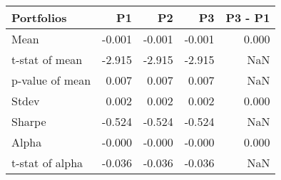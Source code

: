 \begin{tabular}{lrrrr}
\toprule
Portfolios & P1 & P2 & P3 & P3 - P1 \\
\midrule
Mean & -0.001 & -0.001 & -0.001 & 0.000 \\
t-stat of mean & -2.915 & -2.915 & -2.915 & NaN \\
p-value of mean & 0.007 & 0.007 & 0.007 & NaN \\
Stdev & 0.002 & 0.002 & 0.002 & 0.000 \\
Sharpe & -0.524 & -0.524 & -0.524 & NaN \\
Alpha & -0.000 & -0.000 & -0.000 & 0.000 \\
t-stat of alpha & -0.036 & -0.036 & -0.036 & NaN \\
\bottomrule
\end{tabular}
